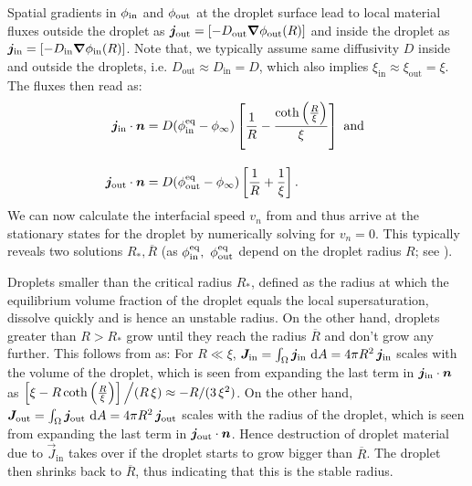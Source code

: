 Spatial gradients in $\phi_\mathrm{in}$ and $\phi_\mathrm{out}$ at the droplet surface lead to local material fluxes outside the droplet as $\boldsymbol{j}_\mathrm{out} = [-D_\mathrm{out} {\boldsymbol{\nabla}} \phi_\mathrm{out} (R)]$ and inside the droplet as $\boldsymbol{j}_\mathrm{in}  = [-D_\mathrm{in} {\boldsymbol{\nabla}} \phi_\mathrm{in} (R)]$.
Note that, we typically assume same diffusivity $D$ inside and outside the droplets, i.e. $D_\mathrm{out} \approx D_\mathrm{in} = D$, which also implies $\xi_\mathrm{in} \approx \xi_\mathrm{out} = \xi$.
The fluxes then read as:
\begin{subequations}
\label{eqn:fluxes_in_firstorder}
\begin{align}
    \boldsymbol{j}_\mathrm{in} \cdot \boldsymbol{n} &= D (\phi^\mathrm{eq}_\mathrm{in}  - \phi_\infty) \left[ \frac{1}{R} - \frac{\coth \left (\frac{R}{\xi}\right )}{\xi} \right ] \mathrm{~and~}
    \\[10pt]
   \boldsymbol{j}_\mathrm{out} \cdot \boldsymbol{n} &= 
    D (\phi^\mathrm{eq}_\mathrm{out}  - \phi_\infty) \left[ \frac{1}{R} + \frac{1}{\xi} \right ].
\end{align}
\end{subequations}
We can now calculate the interfacial speed $v_n$ from  and thus arrive at the stationary states for the droplet by numerically solving for $v_n = 0$.
This typically reveals two solutions $R_\ast, \overline{R}$ (as $\phi^\mathrm{eq}_\mathrm{in},~\phi^\mathrm{eq}_\mathrm{out}$ depend on the droplet radius $R$; see ).

Droplets smaller than the critical radius $R_{\ast}$, defined as the radius at which the equilibrium volume fraction of the droplet equals the local supersaturation, dissolve quickly and is hence an unstable radius. 
On the other hand, droplets greater than $R > R_{\ast}$ grow until they reach the radius $\overline{R}$ and don't grow any further.
This follows from  as: For $R \ll \xi$, $\boldsymbol{J}_\mathrm{in} = \int_\Omega \boldsymbol{j}_\mathrm{in}~\mathrm{d}A = 4 \pi R^2 \,\boldsymbol{j}_\mathrm{in}$ scales with the volume of the droplet, which is seen from expanding the last term in $\boldsymbol{j}_\mathrm{in}\cdot \boldsymbol{n}$ as $\left [\xi - R \coth \left (\frac{R}{\xi}\right ) \right ] \Big {/} (R \, \xi) \approx -R/(3\,\xi^2)$.
On the other hand, $\boldsymbol{J}_\mathrm{out} = \int_\Omega \boldsymbol{j}_\mathrm{out}~\mathrm{d}A = 4 \pi R^2 \,\boldsymbol{j}_\mathrm{out}$ scales with the radius of the droplet, which is seen from expanding the last term in $\boldsymbol{j}_\mathrm{out}\cdot \boldsymbol{n}$.
Hence destruction of droplet material due to $\vec{J}_\mathrm{in}$ takes over if the droplet starts to grow bigger than $\overline{R}$.
The droplet then shrinks back to $\overline{R}$, thus indicating that this is the stable radius. 

